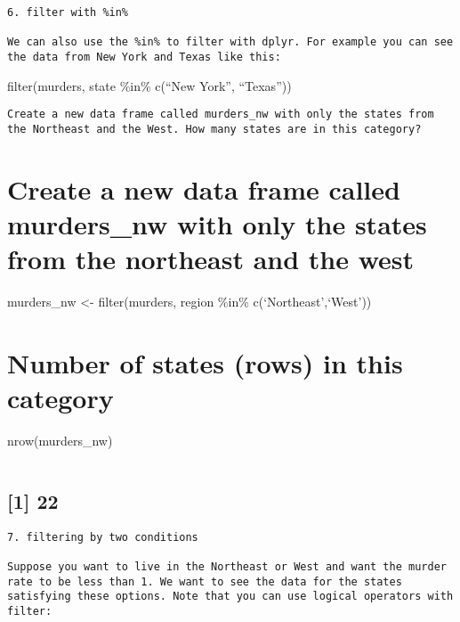 \documentclass[
]{article}
\begin{document}
\begin{verbatim}
6. filter with %in%
    
We can also use the %in% to filter with dplyr. For example you can see the data from New York and Texas like this:
\end{verbatim}

filter(murders, state \%in\% c(``New York'', ``Texas''))

\begin{verbatim}
Create a new data frame called murders_nw with only the states from the Northeast and the West. How many states are in this category?
\end{verbatim}

\hypertarget{create-a-new-data-frame-called-murders_nw-with-only-the-states-from-the-northeast-and-the-west}{%
\section{Create a new data frame called murders\_nw with only the states
from the northeast and the
west}\label{create-a-new-data-frame-called-murders_nw-with-only-the-states-from-the-northeast-and-the-west}}

murders\_nw \textless- filter(murders, region \%in\%
c(`Northeast',`West'))

\hypertarget{number-of-states-rows-in-this-category}{%
\section{Number of states (rows) in this
category}\label{number-of-states-rows-in-this-category}}

nrow(murders\_nw)

\begin{verbatim}
\end{verbatim}

\hypertarget{section-2}{%
\subsection{{[}1{]} 22}\label{section-2}}

\begin{verbatim}
7. filtering by two conditions

Suppose you want to live in the Northeast or West and want the murder rate to be less than 1. We want to see the data for the states satisfying these options. Note that you can use logical operators with filter:
\end{verbatim}
\end{document}
